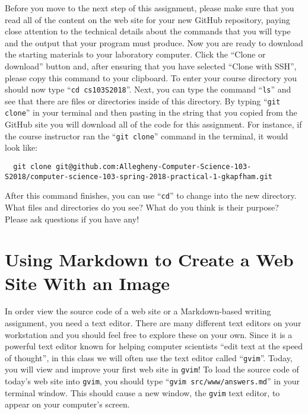 \documentclass[11pt]{article}
\newcommand{\command}[1]{``\lstinline{#1}''}
\newcommand{\program}[1]{\lstinline{#1}}
\begin{document}
Before you move to the next step of this assignment, please make sure that you read all of the content on the web site
for your new GitHub repository, paying close attention to the technical details about the commands that you will type
and the output that your program must produce. Now you are ready to download the starting materials to your laboratory
computer. Click the ``Clone or download'' button and, after ensuring that you have selected ``Clone with SSH'', please
copy this command to your clipboard. To enter your course directory you should now type \command{cd cs103S2018}. Next,
you can type the command \command{ls} and see that there are files or directories inside of this directory. By typing
\command{git clone} in your terminal and then pasting in the string that you copied from the GitHub site you will
download all of the code for this assignment. For instance, if the course instructor ran the \command{git clone} command
in the terminal, it would look like:

\begin{lstlisting}
  git clone git@github.com:Allegheny-Computer-Science-103-S2018/computer-science-103-spring-2018-practical-1-gkapfham.git
\end{lstlisting}

After this command finishes, you can use \command{cd} to change into the new directory. What files and directories do
you see? What do you think is their purpose? Please ask questions if you have any!

\section*{Using Markdown to Create a Web Site With an Image}

In order view the source code of a web site or a Markdown-based writing assignment, you need a text editor. There are
many different text editors on your workstation and you should feel free to explore these on your own. Since it is a
powerful text editor known for helping computer scientists ``edit text at the speed of thought'', in this class we will
often use the text editor called \command{gvim}. Today, you will view and improve your first web site in {\tt gvim}! To
load the source code of today's web site into \program{gvim}, you should type \command{gvim src/www/answers.md} in your
terminal window. This should cause a new window, the \program{gvim} text editor, to appear on your computer's screen.
\end{document}
